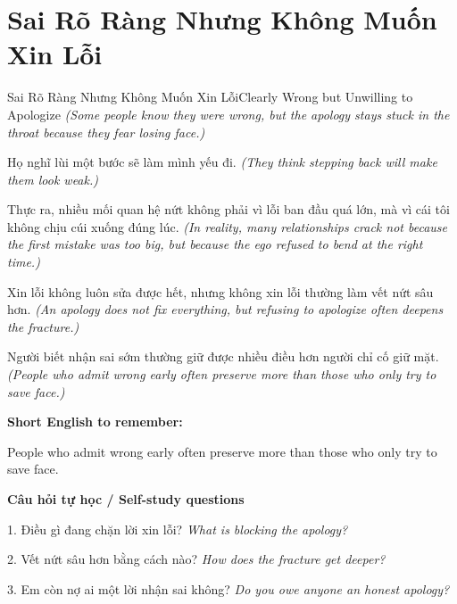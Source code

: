 \section{Sai Rõ Ràng Nhưng Không Muốn Xin Lỗi}
\begin{truyen}{Sai Rõ Ràng Nhưng Không Muốn Xin Lỗi}{Clearly Wrong but Unwilling to Apologize}
\textit{(Some people know they were wrong, but the apology stays stuck in the throat because they fear losing face.)}

Họ nghĩ lùi một bước sẽ làm mình yếu đi.
\textit{(They think stepping back will make them look weak.)}

Thực ra, nhiều mối quan hệ nứt không phải vì lỗi ban đầu quá lớn, mà vì cái tôi không chịu cúi xuống đúng lúc.
\textit{(In reality, many relationships crack not because the first mistake was too big, but because the ego refused to bend at the right time.)}

Xin lỗi không luôn sửa được hết, nhưng không xin lỗi thường làm vết nứt sâu hơn.
\textit{(An apology does not fix everything, but refusing to apologize often deepens the fracture.)}

\end{truyen}

\begin{baihoc}
Người biết nhận sai sớm thường giữ được nhiều điều hơn người chỉ cố giữ mặt.
\textit{(People who admit wrong early often preserve more than those who only try to save face.)}
\end{baihoc}

\begin{ghinhoanh}
\textbf{Short English to remember:}

People who admit wrong early often preserve more than those who only try to save face.

\end{ghinhoanh}

\begin{tuhocnhanh}
\textbf{Câu hỏi tự học / Self-study questions}

1. Điều gì đang chặn lời xin lỗi? \textit{What is blocking the apology?}

2. Vết nứt sâu hơn bằng cách nào? \textit{How does the fracture get deeper?}

3. Em còn nợ ai một lời nhận sai không? \textit{Do you owe anyone an honest apology?}
\end{tuhocnhanh}
\ngancach

